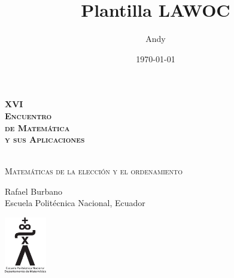 \documentclass[a5paper,doc,10pt,noapacite]{apa6}
\title{Plantilla LAWOC}
\author{Andy}
\date{\today}
\newcommand{\EPN}{Escuela Politécnica Nacional}
\begin{document}
\pagestyle{empty}
{
	\HUGE
	{\bf\textsc{XVI \\[0.5cm] Encuentro  \\[0.5cm] de Matemática \\[0.5cm] y sus Aplicaciones \\[0.5cm] }}
	\\[1cm]
	\large
	
	
	
	\vspace{-2.cm}
	\begin{center}
		
		\textsc{Matemáticas de la elección y el ordenamiento}
		
		\vspace{1.5\baselineskip}
		
		Rafael Burbano
		\\
		
		\normalsize
		\EPN, Ecuador
	\end{center}
}

\vspace{2cm}
\begin{center}
	\includegraphics[height=2.45cm]{Logos/DM-EPN}
\end{center}
\end{document}
